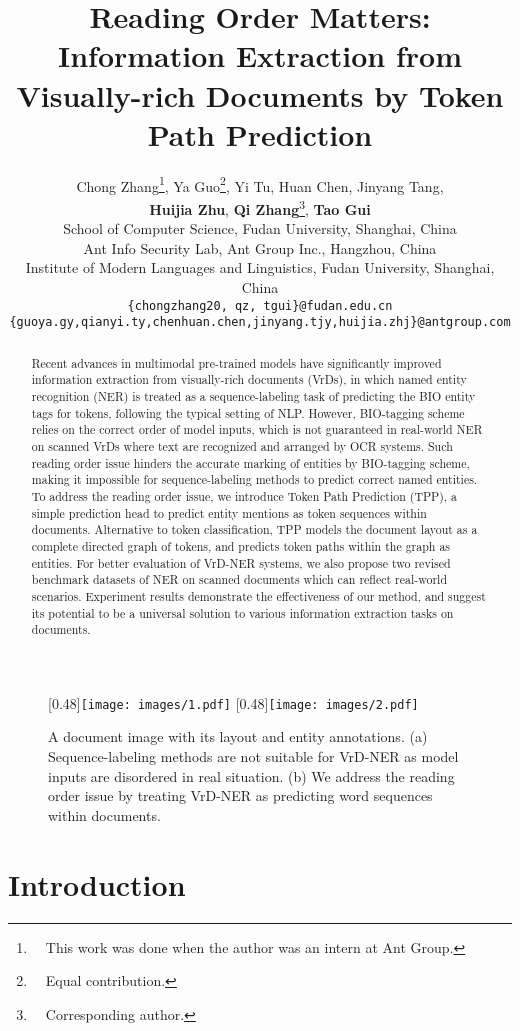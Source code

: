\documentclass[11pt]{article}
\title{Reading Order Matters: Information Extraction from Visually-rich Documents by Token Path Prediction}
\author{
    Chong Zhang\thanks{\ \ This work was done when the author was an intern at Ant Group.}, Ya Guo\thanks{\ \ Equal contribution.}, Yi Tu, Huan Chen, Jinyang Tang, \\
    \textbf{Huijia Zhu}, \textbf{Qi Zhang}\thanks{\ \ Corresponding author.}, \textbf{Tao Gui} \\
     School of Computer Science, Fudan University, Shanghai, China \\ Ant Info Security Lab, Ant Group Inc., Hangzhou, China \\
     Institute of Modern Languages and Linguistics, Fudan University, Shanghai, China \\
     \texttt{\{chongzhang20, qz, tgui\}@fudan.edu.cn} \\ 
     \texttt{\{guoya.gy,qianyi.ty,chenhuan.chen,jinyang.tjy,huijia.zhj\}@antgroup.com} \\
     }
\begin{document}
\maketitle
\begin{abstract}
Recent advances in multimodal pre-trained models have significantly improved information extraction from visually-rich documents (VrDs), in which named entity recognition (NER) is treated as a sequence-labeling task of predicting the BIO entity tags for tokens, following the typical setting of NLP. 
However, BIO-tagging scheme relies on the correct order of model inputs, which is not guaranteed in real-world NER on scanned VrDs where text are recognized and arranged by OCR systems. 
Such reading order issue hinders the accurate marking of entities by BIO-tagging scheme, making it impossible for sequence-labeling methods to predict correct named entities.
To address the reading order issue, we introduce Token Path Prediction (TPP), a simple prediction head to predict entity mentions as token sequences within documents. 
Alternative to token classification, TPP models the document layout as a complete directed graph of tokens, and predicts token paths within the graph as entities. 
For better evaluation of VrD-NER systems, we also propose two revised benchmark datasets of NER on scanned documents which can reflect real-world scenarios.
Experiment results demonstrate the effectiveness of our method, and suggest its potential to be a universal solution to various information extraction tasks on documents.
\end{abstract}

\begin{figure}[t]
\centering
    [0.48\textwidth]{\texttt{[image: images/1.pdf]}}
    [0.48\textwidth]{\texttt{[image: images/2.pdf]}}  
    \caption{
        A document image with its layout and entity annotations. 
        (a) Sequence-labeling methods are not suitable for VrD-NER as model inputs are disordered in real situation. 
        (b) We address the reading order issue by treating VrD-NER as predicting word sequences within documents.}
    \label{fig:1}
\end{figure}

\section{Introduction}
\end{document}
